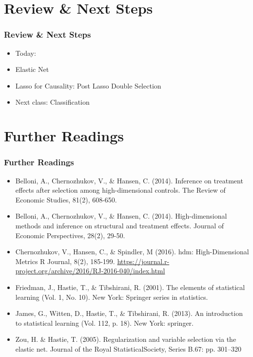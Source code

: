 \documentclass[
  shownotes,
  xcolor={svgnames},
  hyperref={colorlinks,citecolor=DarkBlue,linkcolor=DarkRed,urlcolor=DarkBlue}
  , aspectratio=169]{beamer}
\begin{document}
\section{Review \& Next Steps}
\begin{frame}
\frametitle{Review \& Next Steps}
  
\begin{itemize} 
    \item Today:
    
    \item Elastic Net
    \medskip
    \item Lasso for Causality: Post Lasso Double Selection


    \bigskip  
  \item  Next class:  Classification


\bigskip  

\end{itemize}
\end{frame}
\section{Further Readings}
\begin{frame}
\frametitle{Further Readings}
\scriptsize
\begin{itemize}

  \item Belloni, A., Chernozhukov, V., \& Hansen, C. (2014). Inference on treatment effects after selection among high-dimensional controls. The Review of Economic Studies, 81(2), 608-650.
  \medskip
  \item Belloni, A., Chernozhukov, V., \& Hansen, C. (2014). High-dimensional methods and inference on structural and treatment effects. Journal of Economic Perspectives, 28(2), 29-50.
  \medskip
  \item Chernozhukov, V.,  Hansen, C., \& Spindler, M (2016). hdm: High-Dimensional Metrics R Journal, 8(2), 185-199.  \url{https://journal.r-project.org/archive/2016/RJ-2016-040/index.html}
  \item Friedman, J., Hastie, T., \& Tibshirani, R. (2001). The elements of statistical learning (Vol. 1, No. 10). New York: Springer series in statistics.
  \medskip
  \item James, G., Witten, D., Hastie, T., \& Tibshirani, R. (2013). An introduction to statistical learning (Vol. 112, p. 18). New York: springer.
  \medskip
  \item Zou, H. \& Hastie, T. (2005). Regularization and variable selection via the elastic net. Journal of the Royal StatisticalSociety, Series B.67: pp. 301–320
\end{itemize}

\end{frame}






\end{document}
